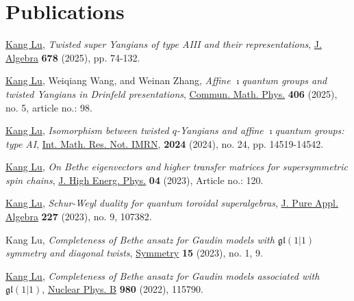\documentclass[11pt,letterpaper,roman,colorlinks,urlcolor=blue,linkcolor=blue
]{moderncv}
\begin{document}
\section{Publications}

\begin{etaremune}[leftmargin=1.17cm]
\item \underline{Kang Lu}, {\textit{Twisted super Yangians of type AIII and their representations}}, \href{https://doi.org/10.1016/j.jalgebra.2025.04.008}{J. Algebra} \textbf{678} (2025), pp. 74-132.

\item \underline{Kang Lu}, Weiqiang Wang, and Weinan Zhang, {\textit{Affine 
$\imath$quantum groups and twisted Yangians in Drinfeld presentations}}, \href{https://link.springer.com/article/10.1007/s00220-025-05263-z}{Commun. Math. Phys.} \textbf{406} (2025), no. 5, article no.: 98.

\item \underline{Kang Lu}, {\textit{Isomorphism between twisted $q$-Yangians and affine $\imath$quantum groups: type AI}}, \href{https://academic.oup.com/imrn/advance-article/doi/10.1093/imrn/rnae248/7876238?utm_source=authortollfreelink&utm_campaign=imrn&utm_medium=email&guestAccessKey=2a26413f-ccaf-4e39-b671-466ba0c7722a}{Int. Math. Res. Not. IMRN},  \textbf{2024} (2024), no. 24, pp. 14519-14542.

\item \underline{Kang Lu}, {\textit{On Bethe eigenvectors and higher transfer matrices for supersymmetric spin chains}}, \href{https://doi.org/10.1007/JHEP04(2023)120}{J. High Energ. Phys.} \textbf{04} (2023), Article no.: 120.

\item \underline{Kang Lu}, {\textit{Schur-Weyl duality for quantum toroidal superalgebras}}, \href{https://doi.org/10.1016/j.jpaa.2023.107382}{J. Pure Appl. Algebra} \textbf{227} (2023), no. 9, 107382.

\item Kang Lu, {\textit{Completeness of Bethe ansatz for Gaudin models with $\mathfrak{gl}(1|1)$
symmetry and diagonal twists}}, \href{https://www.mdpi.com/2073-8994/15/1/9}{Symmetry} \textbf{15} (2023), no. 1, 9.

\item \underline{Kang Lu}, {\textit{Completeness of Bethe ansatz for Gaudin models associated with} $\mathfrak{gl}(1|1)$}, \href{https://www.sciencedirect.com/science/article/pii/S0550321322001419}{Nuclear Phys. B} \textbf{980} (2022), 115790.


\end{etaremune}
\end{document}
